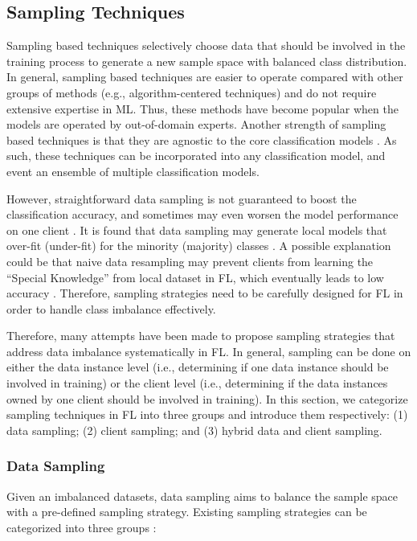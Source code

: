 \documentclass[10pt,journal,compsoc]{IEEEtran}
\begin{document}
\subsection{Sampling Techniques}
Sampling based techniques selectively choose data that should be involved in the training process to generate a new sample space with balanced class distribution. In general, sampling based techniques are easier to operate compared with other groups of methods (e.g., algorithm-centered techniques) and do not require extensive expertise in ML. Thus, these methods have become popular when the models are operated by out-of-domain experts. Another strength of sampling based techniques is that they are agnostic to the core classification models  \cite{lopez2013insight}. As such, these techniques can be incorporated into any classification model, and event an ensemble of multiple classification models. 

However, straightforward data sampling is not guaranteed to boost the classification accuracy, and sometimes may even worsen the model performance on one client \cite{tangdata}. It is found that data sampling may generate local models that over-fit (under-fit) for the minority (majority) classes \cite{cao2019learning}. A possible explanation could be that naive data resampling may prevent clients from learning the ``Special Knowledge'' from local dataset in FL, which eventually leads to low accuracy \cite{cao2019learning}. Therefore, sampling strategies need to be carefully designed for FL in order to handle class imbalance effectively.

Therefore, many attempts have been made to propose sampling strategies that address data imbalance systematically in FL. In general, sampling can be done on either the data instance level (i.e., determining if one data instance should be involved in training) or the client level (i.e., determining if the data instances owned by one client should be involved in training). In this section, we categorize sampling techniques in FL into three groups and introduce them respectively: (1) data sampling; (2) client sampling; and (3) hybrid data and client sampling.
\vspace{-0.2cm}

\subsubsection{Data Sampling}
Given an imbalanced datasets, data sampling aims to balance the sample space with a pre-defined sampling strategy. Existing sampling strategies can be categorized into three groups \cite{haixiang2017learning}:
\end{document}
